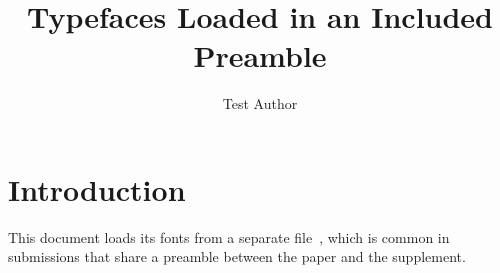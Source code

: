 \documentclass[11pt]{article}
\title{Typefaces Loaded in an Included Preamble}
\author{Test Author}
\begin{document}
\maketitle
\section{Introduction}
This document loads its fonts from a separate file~\cite{smith2020}, which is
common in submissions that share a preamble between the paper and the supplement.


\end{document}
